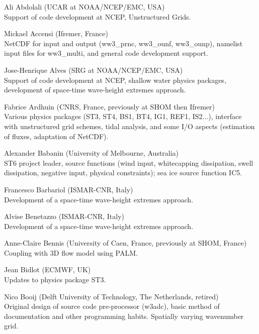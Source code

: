 \begin{list}{\ldots}{ }

\item [Ali Abdolali] (UCAR at NOAA/NCEP/EMC, USA) \\
  Support of code development at NCEP, Unstructured Grids.

\item [Mickael Accensi] (Ifremer, France) \\
  NetCDF for input and output (ww3\_prnc, ww3\_ounf, ww3\_ounp), namelist input files for ww3\_multi, and general code development support.

\item [Jose-Henrique Alves] (SRG at NOAA/NCEP/EMC, USA) \\
  Support of code development at NCEP, shallow water physics packages, development of space-time wave-height extremes approach.

\item [Fabrice Ardhuin] (CNRS, France, previously at SHOM then Ifremer) \\
  Various physics packages (ST3, ST4, BS1, BT4, IG1, REF1, IS2...), interface with unstructured grid schemes, tidal analysis, and some I/O aspects (estimation of fluxes, adaptation of NetCDF). 

\item [Alexander Babanin] (University of Melbourne, Australia)\\
  ST6 project leader, source functions (wind input, whitecapping dissipation, swell dissipation, negative input, physical constraints); sea ice source function IC5.

\item [Francesco Barbariol] (ISMAR-CNR, Italy) \\
  Development of a space-time wave-height extremes approach.

\item [Alvise Benetazzo] (ISMAR-CNR, Italy) \\
  Development of a space-time wave-height extremes approach.

\item [Anne-Claire Bennis] (University of Caen, France, previously at SHOM, France) \\
  Coupling with 3D flow model using PALM.

\item [Jean Bidlot] (ECMWF, UK) \\
  Updates to physics package ST3.

\item [Nico Booij] (Delft University of Technology, The Netherlands, retired) \\
  Original design of source code pre-processor ({\code w3adc}), basic method
  of documentation and other programming habits. Spatially varying wavenumber
  grid.


\end{list}
